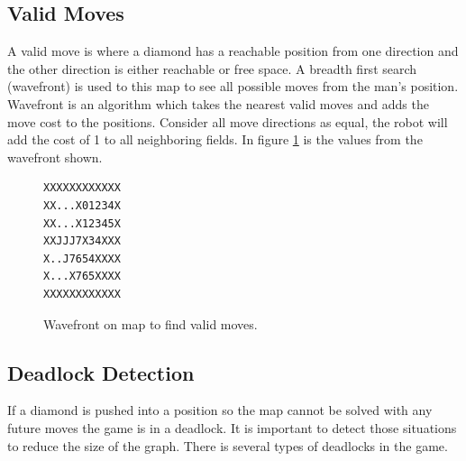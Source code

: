 \subsection{Valid Moves}
A valid move is where a diamond has a reachable position from one direction and the other direction is either reachable or free space.
A breadth first search (wavefront) is used to this map to see all possible moves from the man's position.
Wavefront is an algorithm which takes the nearest valid moves and adds the move cost to the positions.
Consider all move directions as equal, the robot will add the cost of 1 to all neighboring fields.
In figure \ref{fig:wavefront} is the values from the wavefront shown.

\begin{figure}[h]
 \centering
 \begin{minipage}{0.1\textwidth}
\begin{verbatim}
XXXXXXXXXXXX
XX...X01234X
XX...X12345X
XXJJJ7X34XXX
X..J7654XXXX
X...X765XXXX
XXXXXXXXXXXX
\end{verbatim}
 \end{minipage}
 \caption{Wavefront on map to find valid moves.}
 \label{fig:wavefront}
\end{figure}

\subsection{Deadlock Detection}
If a diamond is pushed into a position so the map cannot be solved with any future moves the game is in a deadlock.
It is important to detect those situations to reduce the size of the graph.
There is several types of deadlocks in the game.

